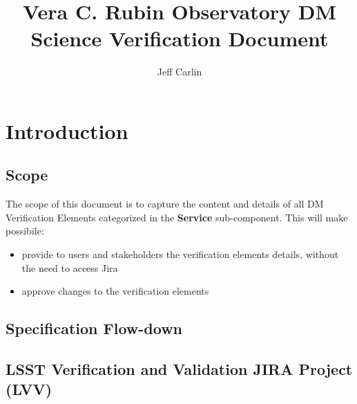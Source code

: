 \documentclass[DM,lsstdraft,STS,toc]{lsstdoc}
\begin{document}
\providecommand{\tightlist}{%
  \setlength{\itemsep}{0pt}\setlength{\parskip}{0pt}}

\def\product{LSST Data Management}


\title[DM Infrastructure Verification Document]{Vera C. Rubin Observatory DM Science Verification Document}

\author{Jeff Carlin}
\setDocRef{\lsstDocType-\lsstDocNum}
\setDocDate{\vcsDate}



\setDocUpstreamVersion{\vcsRevision}

\maketitle


\section{Introduction}\label{sec:intro}


\subsection{Scope}\label{sec:scope}

The scope of this document is to capture the content and details of all DM Verification Elements
categorized in the \textbf{Service} sub-component. This will make possibile:

\begin{itemize}
\item provide to users and stakeholders the verification elements details, without the need to access Jira
\item approve changes to the verification elements
\end{itemize}

\subsection{Specification Flow-down}\label{sec:sepcflowd}


\subsection{LSST Verification and Validation JIRA Project (LVV)}\label{sec:lvv}
\end{document}
